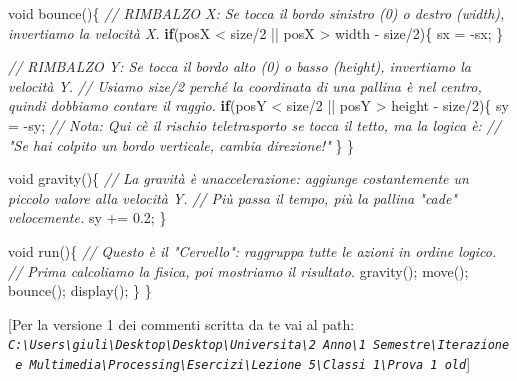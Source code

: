 \documentclass[
]{article}
\newenvironment{Shaded}{}{}
\newcommand{\CommentTok}[1]{\textcolor[rgb]{0.38,0.63,0.69}{\textit{#1}}}
\newcommand{\ControlFlowTok}[1]{\textcolor[rgb]{0.00,0.44,0.13}{\textbf{#1}}}
\newcommand{\DataTypeTok}[1]{\textcolor[rgb]{0.56,0.13,0.00}{#1}}
\newcommand{\DecValTok}[1]{\textcolor[rgb]{0.25,0.63,0.44}{#1}}
\newcommand{\FloatTok}[1]{\textcolor[rgb]{0.25,0.63,0.44}{#1}}
\newcommand{\FunctionTok}[1]{\textcolor[rgb]{0.02,0.16,0.49}{#1}}
\newcommand{\NormalTok}[1]{#1}
\newcommand{\OperatorTok}[1]{\textcolor[rgb]{0.40,0.40,0.40}{#1}}
\begin{document}
\begin{Shaded}
\begin{Highlighting}[]
  \DataTypeTok{void} \FunctionTok{bounce}\OperatorTok{()\{} 
    \CommentTok{// RIMBALZO X: Se tocca il bordo sinistro (0) o destro (width), invertiamo la velocità X.}
    \ControlFlowTok{if}\OperatorTok{(}\NormalTok{posX }\OperatorTok{\textless{}}\NormalTok{ size}\OperatorTok{/}\DecValTok{2} \OperatorTok{||}\NormalTok{ posX }\OperatorTok{\textgreater{}}\NormalTok{ width }\OperatorTok{{-}}\NormalTok{ size}\OperatorTok{/}\DecValTok{2}\OperatorTok{)\{} 
\NormalTok{      sx }\OperatorTok{=} \OperatorTok{{-}}\NormalTok{sx}\OperatorTok{;} 
    \OperatorTok{\}}
    
    \CommentTok{// RIMBALZO Y: Se tocca il bordo alto (0) o basso (height), invertiamo la velocità Y.}
    \CommentTok{// Usiamo size/2 perché la coordinata di una pallina è nel centro, quindi dobbiamo contare il raggio.}
    \ControlFlowTok{if}\OperatorTok{(}\NormalTok{posY }\OperatorTok{\textless{}}\NormalTok{ size}\OperatorTok{/}\DecValTok{2} \OperatorTok{||}\NormalTok{ posY }\OperatorTok{\textgreater{}}\NormalTok{ height }\OperatorTok{{-}}\NormalTok{ size}\OperatorTok{/}\DecValTok{2}\OperatorTok{)\{} 
\NormalTok{      sy }\OperatorTok{=} \OperatorTok{{-}}\NormalTok{sy}\OperatorTok{;} 
      \CommentTok{// Nota: Qui c\textquotesingle{}è il rischio teletrasporto se tocca il tetto, ma la logica è:}
      \CommentTok{// "Se hai colpito un bordo verticale, cambia direzione!"}
    \OperatorTok{\}}
  \OperatorTok{\}}
  
  \DataTypeTok{void} \FunctionTok{gravity}\OperatorTok{()\{}
    \CommentTok{// La gravità è un\textquotesingle{}accelerazione: aggiunge costantemente un piccolo valore alla velocità Y.}
    \CommentTok{// Più passa il tempo, più la pallina "cade" velocemente.}
\NormalTok{    sy }\OperatorTok{+=} \FloatTok{0.2}\OperatorTok{;} 
  \OperatorTok{\}}
  
  \DataTypeTok{void} \FunctionTok{run}\OperatorTok{()\{} 
    \CommentTok{// Questo è il "Cervello": raggruppa tutte le azioni in ordine logico.}
    \CommentTok{// Prima calcoliamo la fisica, poi mostriamo il risultato.}
    \FunctionTok{gravity}\OperatorTok{();}
    \FunctionTok{move}\OperatorTok{();}
    \FunctionTok{bounce}\OperatorTok{();}
    \FunctionTok{display}\OperatorTok{();}
  \OperatorTok{\}}
\OperatorTok{\}}
\end{Highlighting}
\end{Shaded}

{[}Per la versione 1 dei commenti scritta da te vai al path:
\emph{\texttt{C:\textbackslash{}Users\textbackslash{}giuli\textbackslash{}Desktop\textbackslash{}Desktop\textbackslash{}Universita\textbackslash{}2\ Anno\textbackslash{}1\ Semestre\textbackslash{}Iterazione\ e\ Multimedia\textbackslash{}Processing\textbackslash{}Esercizi\textbackslash{}Lezione\ 5\textbackslash{}Classi\ 1\textbackslash{}Prova\ 1\ old}}{]}
\end{document}
